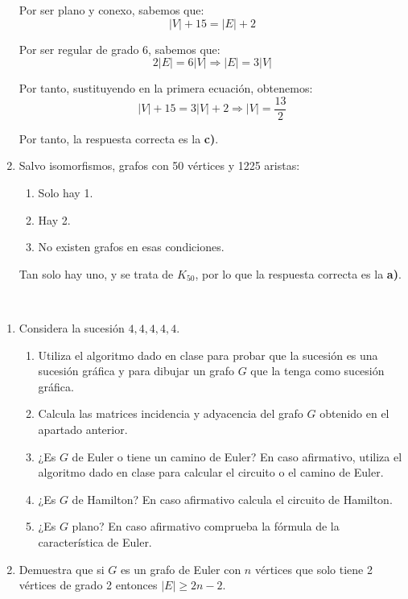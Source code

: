\begin{ejercicio}
\begin{enumerate}
        Por ser plano y conexo, sabemos que:
        \begin{equation*}
            |V|+15=|E|+2
        \end{equation*}

        Por ser regular de grado $6$, sabemos que:
        \begin{equation*}
            2|E|=6|V|\Longrightarrow |E|=3|V|
        \end{equation*}

        Por tanto, sustituyendo en la primera ecuación, obtenemos:
        \begin{equation*}
            |V|+15=3|V|+2\Longrightarrow |V|=\frac{13}{2}
        \end{equation*}

        Por tanto, la respuesta correcta es la \textbf{c)}.
        \item Salvo isomorfismos, grafos con 50 vértices y 1225 aristas:
        \begin{enumerate}
            \item Solo hay 1.
            \item Hay 2.
            \item No existen grafos en esas condiciones.
        \end{enumerate}
        Tan solo hay uno, y se trata de $K_{50}$, por lo que la respuesta correcta es la \textbf{a)}.
    \end{enumerate}
\end{ejercicio}


\begin{ejercicio}\label{ej:1.28}~
    \begin{enumerate}
        \item Considera la sucesión $4,4,4,4,4$.
        \begin{enumerate}
            \item Utiliza el algoritmo dado en clase para probar que la sucesión es una sucesión gráfica y para dibujar un grafo $G$ que la tenga como sucesión gráfica.
            \item Calcula las matrices incidencia y adyacencia del grafo $G$ obtenido en el apartado anterior.
            \item ¿Es $G$ de Euler o tiene un camino de Euler? En caso afirmativo, utiliza el algoritmo dado en clase para calcular el circuito o el camino de Euler.
            \item ¿Es $G$ de Hamilton? En caso afirmativo calcula el circuito de Hamilton.
            \item ¿Es $G$ plano? En caso afirmativo comprueba la fórmula de la característica de Euler.
        \end{enumerate}
        \item Demuestra que si $G$ es un grafo de Euler con $n$ vértices que solo tiene 2 vértices de grado 2 entonces $|E|\geq 2n - 2$.
    \end{enumerate}
\end{ejercicio}

